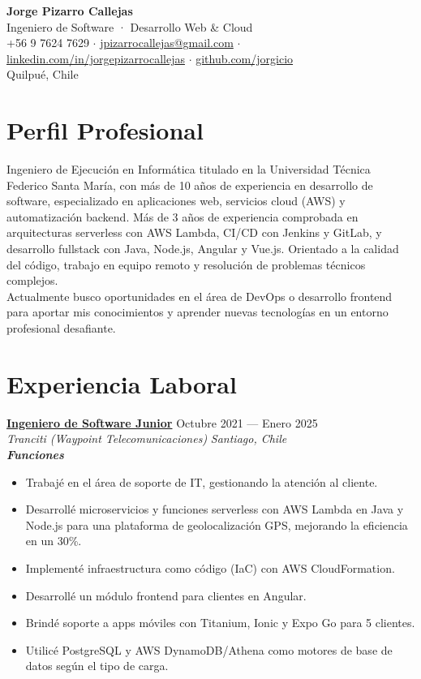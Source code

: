 \documentclass[11pt,a4paper]{article}
\newcommand{\job}[4]{%
    \textbf{\underline{#1}} \hfill #2\\
    \textit{#3} \hfill \textit{#4}\\[2pt]
}
\newcommand{\newsubsection}[1]{
    \vspace{0em}
    \textbf{\textit{#1}}
    \vspace{0em}
}
\begin{document}
\begin{center}
    {\Huge \textbf{Jorge Pizarro Callejas}}\\[4pt]
    {\large Ingeniero de Software · Desarrollo Web \& Cloud}\\[6pt]
    +56 9 7624 7629 \; $\cdot$ \; \href{mailto:jpizarrocallejas@gmail.com}{jpizarrocallejas@gmail.com} \; $\cdot$ \;
    \href{https://linkedin.com/in/jorgepizarrocallejas}{linkedin.com/in/jorgepizarrocallejas} \; $\cdot$ \;
    \href{https://github.com/jorgicio}{github.com/jorgicio}\\[2pt]
    Quilpué, Chile
\end{center}


\section*{Perfil Profesional}
Ingeniero de Ejecución en Informática titulado en la Universidad Técnica Federico Santa María, con más de 10 años de experiencia en desarrollo de software, especializado en aplicaciones web, servicios cloud (AWS) y automatización backend. Más de 3 años de experiencia comprobada en arquitecturas serverless con AWS Lambda, CI/CD con Jenkins y GitLab, y desarrollo fullstack con Java, Node.js, Angular y Vue.js. Orientado a la calidad del código, trabajo en equipo remoto y resolución de problemas técnicos complejos.\\
Actualmente busco oportunidades en el área de DevOps o desarrollo frontend para aportar mis conocimientos y aprender nuevas tecnologías en un entorno profesional desafiante.


\section*{Experiencia Laboral}

\job{Ingeniero de Software Junior}{Octubre 2021 --- Enero 2025}{Tranciti (Waypoint Telecomunicaciones)}{Santiago, Chile}

\newsubsection{Funciones}
\begin{itemize}[leftmargin=*, noitemsep, topsep=2pt]
    \item Trabajé en el área de soporte de IT, gestionando la atención al cliente. 
    \item Desarrollé microservicios y funciones serverless con AWS Lambda en Java y Node.js para una plataforma de geolocalización GPS, mejorando la eficiencia en un 30\%.
    \item Implementé infraestructura como código (IaC) con AWS CloudFormation.
    \item Desarrollé un módulo frontend para clientes en Angular.
    \item Brindé soporte a apps móviles con Titanium, Ionic y Expo Go para 5 clientes.
    \item Utilicé PostgreSQL y AWS DynamoDB/Athena como motores de base de datos según el tipo de carga.
\end{itemize}
\end{document}
